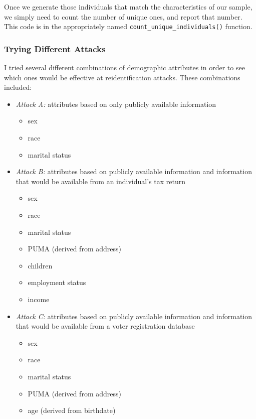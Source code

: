 \documentclass[12pt]{article}
\def\cl{\lstinline}
\begin{document}
\medskip

Once we generate those individuals that match the characteristics of our sample, we simply need to count the number of unique ones, and report that number. This code is in the appropriately named \cl{count_unique_individuals()} function.

\subsubsection{Trying Different Attacks}

\noindent

I tried several different combinations of demographic attributes in order to see which ones would be effective at reidentification attacks. These combinations included:

\begin{itemize}
  \item \textit{Attack A:} attributes based on only publicly available information
  \begin{itemize}
    \item sex
    \item race
    \item marital status
  \end{itemize}
  \item \textit{Attack B:} attributes based on publicly available information and information that would be available from an individual's tax return
  \begin{itemize}
    \item sex
    \item race
    \item marital status
    \item PUMA (derived from address)
    \item children
    \item employment status
    \item income
  \end{itemize}
  \item \textit{Attack C:} attributes based on publicly available information and information that would be available from a voter registration database
  \begin{itemize}
    \item sex
    \item race
    \item marital status
    \item PUMA (derived from address)
    \item age (derived from birthdate)

\end{itemize}
\end{itemize}
\end{document}
